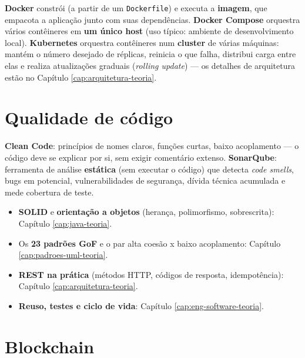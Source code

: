 \begin{conceito}
\textbf{Docker} constrói (a partir de um \texttt{Dockerfile}) e executa a
\textbf{imagem}, que empacota a aplicação junto com suas dependências.
\textbf{Docker Compose} orquestra vários contêineres em \textbf{um único
host} (uso típico: ambiente de desenvolvimento local). \textbf{Kubernetes}
orquestra contêineres num \textbf{cluster} de várias máquinas: mantém o
número desejado de réplicas, reinicia o que falha, distribui carga entre
elas e realiza atualizações graduais (\textit{rolling update}) --- os
detalhes de arquitetura estão no Capítulo \ref{cap:arquitetura-teoria}.
\end{conceito}

\section{Qualidade de código}

\begin{conceito}
\textbf{Clean Code}: princípios de nomes claros, funções curtas, baixo
acoplamento --- o código deve se explicar por si, sem exigir comentário
extenso. \textbf{SonarQube}: ferramenta de análise \textbf{estática}
(sem executar o código) que detecta \textit{code smells}, bugs em
potencial, vulnerabilidades de segurança, dívida técnica acumulada e mede
cobertura de teste.
\end{conceito}

\begin{conceito}
\begin{itemize}
\item \textbf{SOLID} e \textbf{orientação a objetos} (herança,
polimorfismo, sobrescrita): Capítulo \ref{cap:java-teoria}.
\item Os \textbf{23 padrões GoF} e o par alta coesão x baixo acoplamento:
Capítulo \ref{cap:padroes-uml-teoria}.
\item \textbf{REST na prática} (métodos HTTP, códigos de resposta,
idempotência): Capítulo \ref{cap:arquitetura-teoria}.
\item \textbf{Reuso, testes e ciclo de vida}: Capítulo
\ref{cap:eng-software-teoria}.
\end{itemize}
\end{conceito}

\section{Blockchain}

